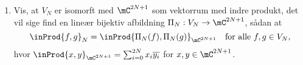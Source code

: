 \begin{opg}[Vektorrumstruktur]
\begin{enumerate}
\begin{proof}[Løsning]
	Det følger af resultater fra lineær algebra, at $\cbrac{e_k}_{k=-N,\ldots,N}$ er lineært uafhængige i $\text{PC}_{2\pi}$, hvorfor de ligeledes er lineært uafhængige som elementer i $V_N$. Endelig har vi, at 
	$$ V_N = \text{span} \setbrac{e_k}{k = -N, \ldots, N}, $$
	hvorfor det følger at $\dim_\mC\pare{V_N} = 2N+1$.
	\end{proof}\fi
	
	\item Vis, at $V_N$ er isomorft med $\mC^{2N+1}$ som vektorrum med indre produkt, det vil sige find en lineær bijektiv afbildning 
	$\Pi_N: V_N \to \mC^{2N+1}$,
	sådan at
    $$ \inProd{f,g}_N = \inProd{\Pi_N(f),\Pi_N(g)}_{\mC^{2N+1}}
            \quad \text{for alle $f,g \in V_N$}, $$
	hvor $\inProd{x,y}_{\mC^{2N+1}}=\sum _{i=0}^{2N} x_i \overline{y_i}$ for $x,y\in\mC^{2N+1}$.
	
	\iffalse\begin{proof}[Løsning]
	Definér $\Pi_N\colon V_N\to\mC^{2N+1}$ ved 
	$$ \Pi_N\pare{e_k}
	    = \begin{pmatrix}0\\ \vdots\\0 \\ 1 \\ 0 \\ \vdots \\ 0 \end{pmatrix}
	    \leftarrow (N+k)'\text{te koordinat}.$$
	og udvid $\Pi_N$ til en lineær afbildning. Det er let at se, at $\Pi_N$ er bijektiv.
	
	Lad nu $f,g\in V_N$ og skriv
	$$ f = \sum_{k=-N}^N a_ke_k, \QUAD g = \sum_{l=-N}^N b_le_l, $$
	for $a_k,b_l\in\mC$. Da er 
	$$ \inProd{f,g}_{V_N} = \sum_{k,l=-N}^N a_k\overline{b_l}\inProd{e_k,e_l}_{V_N}
	    = \sum_{k,l=-N}^N a_k\overline{b_l}\delta_{k,l}
	    = \sum_{k=-N}^N a_k\overline{b_k}
	    = \inProd{\begin{pmatrix} a_{-N} \\ \vdots \\ a_N\end{pmatrix}, \begin{pmatrix} b_{-N} \\ \vdots \\ b_N\end{pmatrix}}_\mC
	    = \inProd{\Pi_N\pare{f},\Pi_N\pare{g}}_\mC $$
	\end{proof}\fi
\end{enumerate}
\end{opg}


